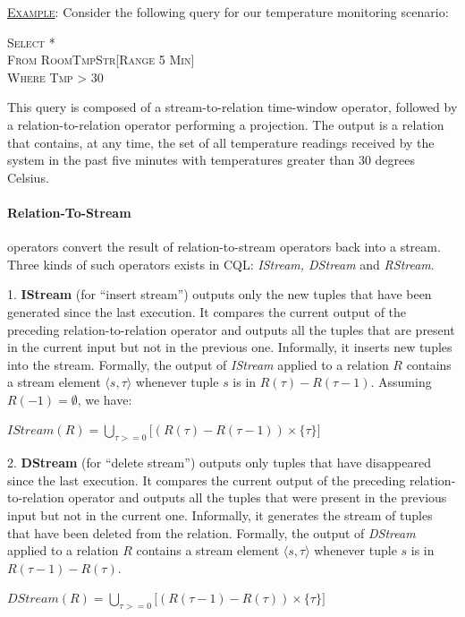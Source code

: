 \underline{\textsc{Example}}: Consider the following query for our temperature monitoring scenario:

\tab \textsc{Select *} \\
\tab \textsc{From RoomTmpStr[Range 5 Min]} \\
\tab \textsc{Where Tmp > 30} 

This query is composed of a stream-to-relation time-window operator, followed by a relation-to-relation
operator performing a projection. The output is a relation that contains, at any time, the set of all
temperature readings received by the system in the past five minutes with temperatures greater than 30
degrees Celsius. 

\paragraph{Relation-To-Stream} operators convert the result of relation-to-stream operators back into a
stream. Three kinds of such operators exists in CQL: \textit{IStream, DStream} and \textit{RStream}.

1. \textbf{IStream} (for ``insert stream'') outputs only the new tuples that have been generated since
the last execution. It compares the current output of the preceding relation-to-relation operator and
outputs all the tuples that are present in the current input but not in the previous one. Informally, it
inserts new tuples into the stream. Formally, the output of \textit{IStream} applied to a relation $R$
contains a stream element $\langle s, \tau \rangle$ whenever tuple $s$ is in $R(\tau)-R(\tau-1)$. Assuming
$R(-1)=\emptyset$, we have: %

\begin{center}
	$IStream(R) = \bigcup_{\tau>=0}\Big[(R(\tau)-R(\tau-1))\times\{\tau\}\Big]$ %
\end{center}

2. \textbf{DStream} (for ``delete stream'') outputs only tuples that have disappeared since the last
execution. It compares the current output of the preceding relation-to-relation operator and
outputs all the tuples that were present in the previous input but not in the current one. Informally,
it generates the stream of tuples that have been deleted from the relation. Formally, the output of
\textit{DStream} applied to a relation $R$ contains a stream element $\langle s, \tau \rangle$ whenever tuple $s$ is in
$R(\tau-1)-R(\tau)$. %

\begin{center}
	$DStream(R) = \bigcup_{\tau>=0}\Big[(R(\tau-1)-R(\tau))\times\{\tau\}\Big]$ %
\end{center}

